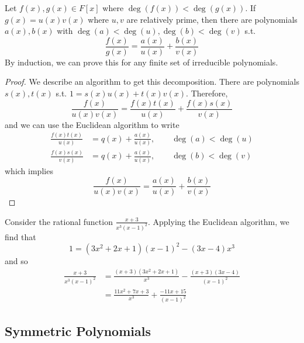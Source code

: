   \begin{theorem}
    Let $f(x), g(x) \in F[x]$ where $\deg(f(x)) < \deg(g(x))$. If $g(x) = u(x) v(x)$ where $u, v$ are relatively prime, then there are polynomials $a(x), b(x)$ with $\deg(a) < \deg(u), \deg(b) < \deg(v)$ s.t. 
    \begin{equation}
      \frac{f(x)}{g(x)} = \frac{a(x)}{u(x)} + \frac{b(x)}{v(x)}
    \end{equation}
    By induction, we can prove this for any finite set of irreducible polynomials. 
  \end{theorem}
  \begin{proof}
    We describe an algorithm to get this decomposition. There are polynomials $s(x), t(x)$ s.t. $1 = s(x) u(x) + t(x) v(x)$. Therefore, 
    \begin{equation}
      \frac{f(x)}{ u(x) v(x)} = \frac{f(x) t(x)}{u(x)} + \frac{f(x) s(x)}{v(x)}
    \end{equation}
    and we can use the Euclidean algorithm to write 
    \begin{align}
      \frac{f(x) t(x)}{u(x)} & = q(x) + \frac{a(x)}{u(x)}, \qquad \deg(a) < \deg(u) \\
      \frac{f(x) s(x)}{v(x)} & = q(x) + \frac{a(x)}{u(x)}, \qquad \deg(b) < \deg(v)
    \end{align}
    which implies 
    \begin{equation}
      \frac{f(x)}{u(x) v(x)} = \frac{a(x)}{u(x)} + \frac{b(x)}{v(x)}
    \end{equation}
  \end{proof}

  \begin{example}
    Consider the rational function $\frac{x + 3}{x^3 (x - 1)^2}$. Applying the Euclidean algorithm, we find that 
    \begin{equation}
      1 = (3x^2 + 2x + 1) (x - 1)^2 - (3x - 4) x^3
    \end{equation}
    and so 
    \begin{align}
      \frac{x + 3}{x^3 (x - 1)^2} & = \frac{(x + 3)(3x^2 + 2x + 1)}{x^3} - \frac{(x + 3)(3x - 4)}{(x - 1)^2} \\
                                  & = \frac{11x^2 + 7x + 3}{x^3} + \frac{-11x + 15}{(x - 1)^2}
    \end{align}
  \end{example}

\subsection{Symmetric Polynomials}

